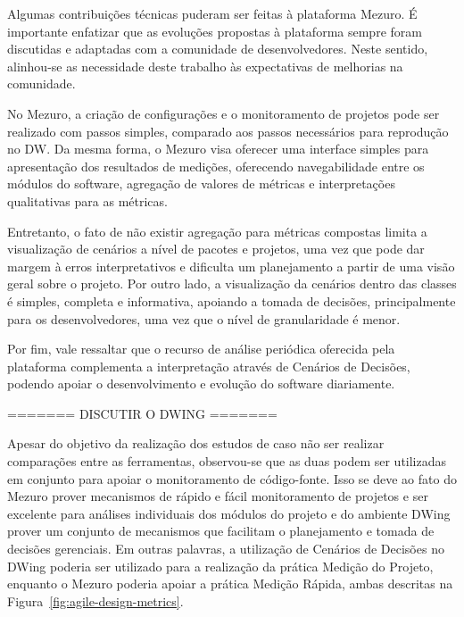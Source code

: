 Algumas contribuições técnicas puderam ser feitas à plataforma Mezuro. É importante enfatizar que as evoluções propostas à plataforma sempre foram discutidas e adaptadas com a comunidade de desenvolvedores. Neste sentido, alinhou-se as necessidade deste trabalho às expectativas de melhorias na comunidade.

No Mezuro, a criação de configurações e o monitoramento de projetos pode ser realizado com passos simples, comparado aos passos necessários para reprodução no DW. Da mesma forma, o Mezuro visa oferecer uma interface simples para apresentação dos resultados de medições, oferecendo navegabilidade entre os módulos do software, agregação de valores de métricas e interpretações qualitativas para as métricas.

Entretanto, o fato de não existir agregação para métricas compostas limita a visualização de cenários a nível de pacotes e projetos, uma vez que pode dar margem à erros interpretativos e dificulta um planejamento a partir de uma visão geral sobre o projeto. Por outro lado, a visualização da cenários dentro das classes é simples, completa e informativa, apoiando a tomada de decisões, principalmente para os desenvolvedores, uma vez que o nível de granularidade é menor.

Por fim, vale ressaltar que o recurso de análise periódica oferecida pela plataforma complementa a interpretação através de Cenários de Decisões, podendo apoiar o desenvolvimento e evolução do software diariamente.

======= DISCUTIR O DWING =======

Apesar do objetivo da realização dos estudos de caso não ser realizar comparações entre as ferramentas, observou-se que as duas podem ser utilizadas em conjunto para apoiar o monitoramento de código-fonte. Isso se deve ao fato do Mezuro prover mecanismos de rápido e fácil monitoramento de projetos e ser excelente para análises individuais dos módulos do projeto e do ambiente DWing prover um conjunto de mecanismos que facilitam o planejamento e tomada de decisões gerenciais. Em outras palavras, a utilização de Cenários de Decisões no DWing poderia ser utilizado para a realização da prática Medição do Projeto, enquanto o Mezuro poderia apoiar a prática Medição Rápida, ambas descritas na Figura~\ref{fig:agile-design-metrics}.